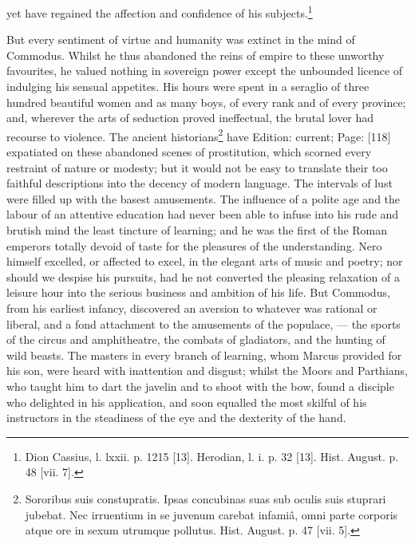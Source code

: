 yet have regained the affection and confidence of his subjects.\footnote{Dion Cassius, l. lxxii. p. 1215 [13]. Herodian, l. i. p. 32 [13]. Hist. August. p. 48 [vii. 7].}

But every sentiment of virtue and humanity was extinct in the mind of Commodus. Whilst he thus abandoned the reins of empire to these unworthy favourites, he valued nothing in sovereign power except the unbounded licence of indulging his sensual appetites. His hours were spent in a seraglio of three hundred beautiful women and as many boys, of every rank and of every province; and, wherever the arts of seduction proved ineffectual, the brutal lover had recourse to violence. The ancient historians\footnote{Sororibus suis constupratis. Ipsas concubinas suas sub oculis suis stuprari jubebat. Nec irruentium in se juvenum carebat infamiâ, omni parte corporis atque ore in sexum utrumque pollutus. Hist. August. p. 47 [vii. 5].} have Edition: current; Page: [118] expatiated on these abandoned scenes of prostitution, which scorned every restraint of nature or modesty; but it would not be easy to translate their too faithful descriptions into the decency of modern language. The intervals of lust were filled up with the basest amusements. The influence of a polite age and the labour of an attentive education had never been able to infuse into his rude and brutish mind the least tincture of learning; and he was the first of the Roman emperors totally devoid of taste for the pleasures of the understanding. Nero himself excelled, or affected to excel, in the elegant arts of music and poetry; nor should we despise his pursuits, had he not converted the pleasing relaxation of a leisure hour into the serious business and ambition of his life. But Commodus, from his earliest infancy, discovered an aversion to whatever was rational or liberal, and a fond attachment to the amusements of the populace, \texthebrew{—} the sports of the circus and amphitheatre, the combats of gladiators, and the hunting of wild beasts. The masters in every branch of learning, whom Marcus provided for his son, were heard with inattention and disgust; whilst the Moors and Parthians, who taught him to dart the javelin and to shoot with the bow, found a disciple who delighted in his application, and soon equalled the most skilful of his instructors in the steadiness of the eye and the dexterity of the hand.

